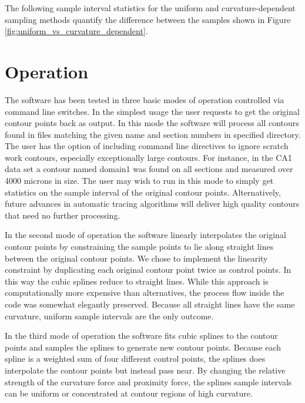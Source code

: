 \documentclass[12pt]{article}
\begin{document}
The following sample interval statistics for the uniform and curvature-dependent
sampling methods quantify the difference between the samples shown in
Figure \ref{fig:uniform_vs_curvature_dependent}.

\begin{alltt}
\tiny

\end{alltt}

\begin{alltt}
\tiny

\end{alltt}

\section{Operation}

The software has been tested in three basic modes of operation controlled
via command line switches. In the simplest usage the user requests
to get the original contour points back as output. In this mode the
software will process all contours found in files matching the given
name and section numbers in specified directory. The user has the option
of including command line directives to ignore scratch work contours,
especially exceptionally large contours. For instance, in the CA1 data
set a contour named domain1 was found on all sections and measured over
4000 microns in size. The user may wish to run in this mode to simply
get statistics on the sample interval of the original contour points.
Alternatively, future advances in automatic tracing algorithms will
deliver high quality contours that need no further processing.

In the second mode of operation the software linearly interpolates
the original contour points by constraining the sample points
to lie along straight lines between the original contour points. 
We chose to implement the linearity constraint by duplicating each
original contour point twice as control points. In this way the cubic
splines reduce to straight lines. While this approach is computationally
more expensive than alternatives, the process flow inside the code was
somewhat elegantly preserved. Because all straight lines have the same
curvature, uniform sample intervals are the only outcome.

In the third mode of operation the software fits cubic splines to the
contour points and samples the splines to generate new contour points.
Because each spline is a weighted sum of four different control points,
the splines does interpolate the contour points but instead pass near.
By changing the relative strength of the curvature force and proximity
force, the splines sample intervals can be uniform or concentrated at
contour regions of high curvature.
\end{document}
